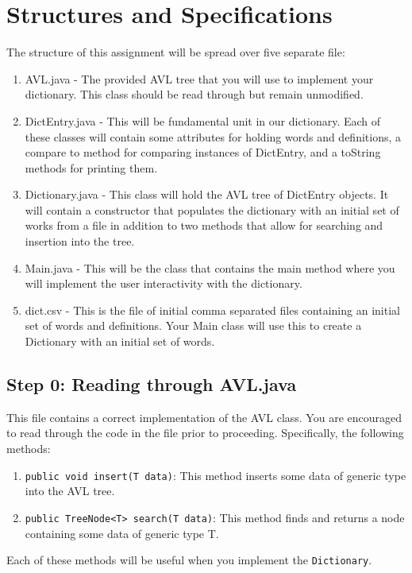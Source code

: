 \documentclass[a4paper]{article}
\begin{document}
\section{Structures and Specifications}

The structure of this assignment will be spread over five separate file:
\begin{enumerate}
    \item AVL.java - The provided AVL tree that you will use to implement your dictionary. This class should be read through but remain unmodified.
    \item DictEntry.java - This will be fundamental unit in our dictionary. Each of these classes will contain some attributes for holding words and definitions, a compare to method for comparing instances of DictEntry, and a toString methods for printing them.
    \item Dictionary.java - This class will hold the AVL tree of DictEntry objects. It will contain a constructor that populates the dictionary with an initial set of works from a file in addition to two methods that allow for searching and insertion into the tree.
    \item Main.java - This will be the class that contains the main method where you will implement the user interactivity with the dictionary.
    \item dict.csv - This is the file of initial comma separated files containing an initial set of words and definitions. Your Main class will use this to create a Dictionary with an initial set of words.
\end{enumerate}

\subsection{Step 0: Reading through AVL.java}

This file contains a correct implementation of the AVL class. You are
encouraged to read through the code in the file prior to proceeding.
Specifically, the following methods:
\begin{enumerate}
    \item \lstinline|public void insert(T data)|: This method inserts some data of generic type into the AVL tree.
    \item \lstinline|public TreeNode<T> search(T data)|: This method finds and returns a node containing some data of generic type T.
\end{enumerate}
Each of these methods will be useful when you implement the
\lstinline|Dictionary|.
\end{document}
